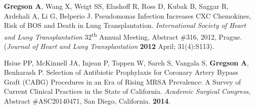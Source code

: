 \documentclass[12pt]{moderncv} %
\begin{document}
\begin{thebibliography}{1}
\bibitem[11]{} \textbf{Gregson A}, Wang X, Weigt SS, Elashoff R, Ross D, Kubak B, Saggar R, Ardehali A, Li G, Belperio J. Pseudomonas Infection Increases {\smaller CXC} Chemokines, Risk of {\smaller BOS} and Death in Lung Transplantation. \textit{International Society of Heart and Lung Transplantation} 32\textsuperscript{th} Annual Meeting, Abstract \#316, 2012, Prague. (\textit{Journal of Heart and Lung Transplantation} \textbf{2012} April; 31(4):S113).

\bibitem[12]{} Hsiue PP, McKinnell JA, Injean P, Toppen W, Sareh S, Vangala S, \textbf{Gregson A}, Benharash P. Selection of Antibiotic Prophylaxis for Coronary Artery Bypass Graft ({\smaller CABG}) Procedures in an Era of Rising {\smaller MRSA} Prevalence: A Survey of Current Clinical Practices in the State of California. \textit{Academic Surgical Congress}, Abstract \#ASC20140471, San Diego, California. \textbf{2014}. 


\end{thebibliography}
\end{document}

